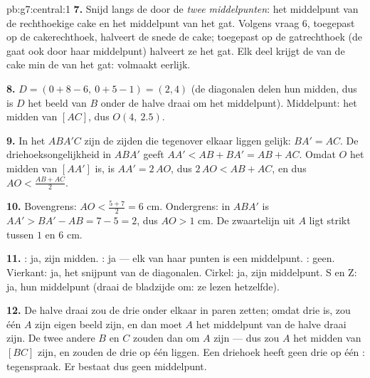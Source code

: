 \begin{solution}{pb:g7:central:1}
\textbf{7.} Snijd langs de  door de \emph{twee middelpunten}: het middelpunt van
de rechthoekige cake en het middelpunt van het gat. Volgens vraag 6, toegepast op de
cakerechthoek, halveert de snede de cake; toegepast op de gatrechthoek (de  gaat
ook door haar middelpunt) halveert ze het gat. Elk deel krijgt de  van de cake
min de  van het gat: volmaakt eerlijk.

\textbf{8.} $D = (0 + 8 - 6,\ 0 + 5 - 1) = (2, 4)$ (de diagonalen delen hun midden,
dus is $D$ het beeld van $B$ onder de halve draai om het middelpunt). Middelpunt: het
midden van $[AC]$, dus $O(4,\ 2.5)$.

\textbf{9.} In het  $ABA'C$ zijn de zijden die tegenover elkaar liggen
gelijk: $BA' = AC$. De driehoeksongelijkheid in $ABA'$ geeft
$AA' < AB + BA' = AB + AC$. Omdat $O$ het midden van $[AA']$ is, is $AA' = 2\,AO$,
dus $2\,AO < AB + AC$, en dus $AO < \frac{AB + AC}{2}$.

\textbf{10.} Bovengrens: $AO < \frac{5 + 7}{2} = 6$ cm. Ondergrens: in $ABA'$ is
$AA' > BA' - AB = 7 - 5 = 2$, dus $AO > 1$ cm. De zwaartelijn uit $A$ ligt strikt
tussen $1$ en $6$ cm.

\textbf{11.} : ja, zijn midden. : ja --- elk van haar punten is een
middelpunt. : geen. Vierkant: ja, het snijpunt van de
diagonalen. Cirkel: ja, zijn middelpunt. S en Z: ja, hun middelpunt (draai de
bladzijde om: ze lezen hetzelfde).

\textbf{12.} De halve draai zou de drie  onder elkaar in paren zetten;
omdat drie  is, zou één  $A$ zijn eigen beeld zijn, en dan moet $A$ het
middelpunt van de halve draai zijn. De twee andere  $B$ en $C$ zouden dan
 om $A$ zijn --- dus zou $A$ het midden van $[BC]$ zijn, en zouden de
drie  op één  liggen. Een driehoek heeft geen drie  op één
: tegenspraak. Er bestaat dus geen middelpunt.


\end{solution}
